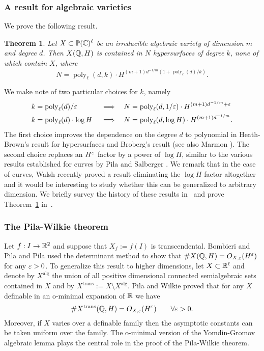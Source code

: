 \documentclass[reqno]{amsart}
\newtheorem{Thm}{Theorem}{\bfseries}{\itshape}
\renewcommand\~[1]{\widetilde{#1}}
\def\poly{\operatorname{poly}} \def\J{\operatorname{J}}
\def\alg{\mathrm{alg}}
\def\trans{\mathrm{trans}}
\begin{document}
\subsubsection{A result for algebraic varieties}

We prove the following result.

\begin{Thm}\label{thm:improved-marmon}
  Let $X\subset{\mathbb P}({\mathbb C})^\ell$ be an irreducible algebraic variety of
  dimension $m$ and degree $d$. Then $X({\mathbb Q},H)$ is contained in $N$
  hypersurfaces of degree $k$, none of which contain $X$, where
  \begin{equation}
    N = \poly_\ell(d,k)\cdot H^{(m+1)d^{-1/m}(1+\poly_\ell(d)/k)}.
  \end{equation}
\end{Thm}

We make note of two particular choices for $k$, namely
\begin{align}
  k&=\poly_\ell(d)/\e & &\implies & N &= \poly_\ell(d,1/\e)\cdot H^{(m+1)d^{-1/m}+\e} \\
  k&=\poly_\ell(d)\cdot\log H & &\implies & N &= \poly_\ell(d,\log H)\cdot H^{(m+1)d^{-1/m}}.
\end{align}
The first choice improves the dependence on the degree $d$ to
polynomial in Heath-Brown's result \cite{heath-brown:density} for
hypersurfaces and Broberg's result \cite[Theorem~1]{broberg:note} (see
also Marmon \cite{marmon}). The second choice replaces an $H^\varepsilon$
factor by a power of $\log H$, similar to the various results
established for curves by Pila \cite{pila:pems} and Salberger
\cite{salberger:density}. We remark that in the case of curves, Walsh
\cite{walsh:boundd-rational} recently proved a result eliminating the
$\log H$ factor altogether and it would be interesting to study
whether this can be generalized to arbitrary dimension. We briefly
survey the history of these results
in~ and prove
Theorem~\ref{thm:improved-marmon} in~.

\subsubsection{The Pila-Wilkie theorem}

Let $f:I\to{\mathbb R}^2$ and suppose that $X_f:=f(I)$ is
transcendental. Bombieri and Pila \cite{bombieri-pila} and Pila
\cite{pila:density-Q} used the determinant method to show that
$\#X({\mathbb Q},H)=O_{X,\varepsilon}(H^\varepsilon)$ for any $\varepsilon>0$. To generalize this result
to higher dimensions, let $X\subset{\mathbb R}^\ell$ and denote by $X^\alg$ the
union of all positive dimensional connected semialgebraic sets
contained in $X$ and by $X^\trans:=X\setminus X^\alg$. Pila and Wilkie
\cite{pila-wilkie} proved that for any $X$ definable in an o-minimal
expansion of ${\mathbb R}$ we have
\begin{equation}
  \#X^\trans(\Q,H)=O_{X,\e}(H^\e) \qquad \forall\e>0.
\end{equation}
Moreover, if $X$ varies over a definable family then the asymptotic
constants can be taken uniform over the family. The o-minimal version
of the Yomdin-Gromov algebraic lemma plays the central role in the
proof of the Pila-Wilkie theorem.
\end{document}

